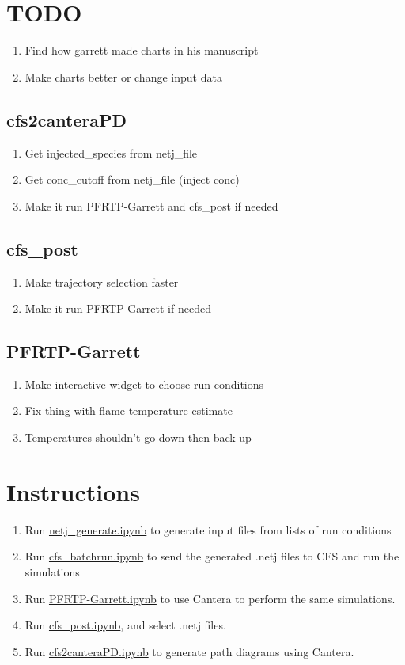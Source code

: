 \documentclass{article}
\begin{document}
\section*{TODO}
\begin{enumerate}
    \item Find how garrett made charts in his manuscript 
    \item Make charts better or change input data
\end{enumerate}

\subsection*{cfs2canteraPD}
\begin{enumerate}
    \item Get injected\_species from netj\_file
    \item Get conc\_cutoff from netj\_file (inject conc)
    \item Make it run PFRTP-Garrett and cfs\_post if needed
\end{enumerate}

\subsection*{cfs\_post}
\begin{enumerate}
    \item Make trajectory selection faster
    \item Make it run PFRTP-Garrett if needed
\end{enumerate}

\subsection*{PFRTP-Garrett}
\begin{enumerate}
    \item Make interactive widget to choose run conditions
    \item Fix thing with flame temperature estimate
    \item Temperatures shouldn't go down then back up
\end{enumerate}

\section*{Instructions}
\begin{enumerate}
    \item Run \href{netj_generate.ipynb}{netj\_generate.ipynb} to generate input files from lists of run conditions
    \item Run \href{cfs_batchrun.ipynb}{cfs\_batchrun.ipynb} to send the generated .netj files to CFS and run the simulations
    \item Run \href{PFRTP-Garrett.ipynb}{PFRTP-Garrett.ipynb} to use Cantera to perform the same simulations.
    \item Run \href{cfs_post.ipynb}{cfs\_post.ipynb}, and select .netj files.
    \item Run \href{cfs2canteraPD.ipynb}{cfs2canteraPD.ipynb} to generate path diagrams using Cantera.
\end{enumerate}
\end{document}
